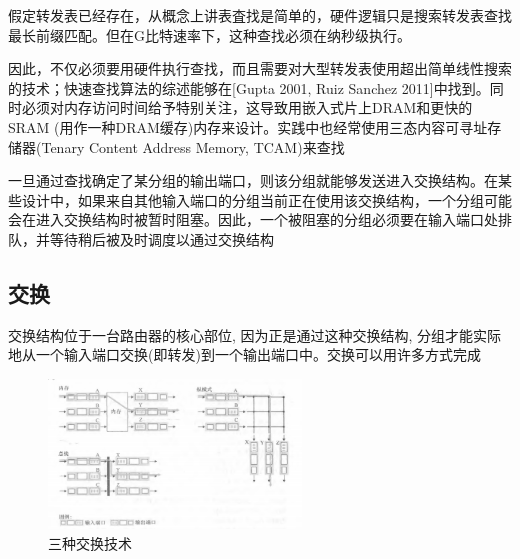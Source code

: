     假定转发表已经存在，从概念上讲表査找是简单的，硬件逻辑只是搜索转发表查找最长前缀匹配。但在G比特速率下，这种查找必须在纳秒级执行。

    因此，不仅必须要用硬件执行查找，而且需要对大型转发表使用超出简单线性搜索的技术；快速查找算法的综述能够在[Gupta 2001, Ruiz Sanchez 2011]中找到。同时必须对内存访问时间给予特别关注，这导致用嵌入式片上DRAM和更快的SRAM (用作一种DRAM缓存)内存来设计。实践中也经常使用三态内容可寻址存储器(Tenary Content Address Memory, TCAM)来查找

    一旦通过查找确定了某分组的输出端口，则该分组就能够发送进入交换结构。在某些设计中，如果来自其他输入端口的分组当前正在使用该交换结构，一个分组可能会在进入交换结构时被暂时阻塞。因此，一个被阻塞的分组必须要在输入端口处排队，并等待稍后被及时调度以通过交换结构

\subsection{交换}

    交换结构位于一台路由器的核心部位, 因为正是通过这种交换结构, 分组才能实际地从一个输入端口交换(即转发)到一个输出端口中。交换可以用许多方式完成

\begin{figure}[!htbp]
    \centering
    \includegraphics[width=0.6\textwidth]{image/chapter04/三种交换技术.png}
    \caption{三种交换技术}
\end{figure}

